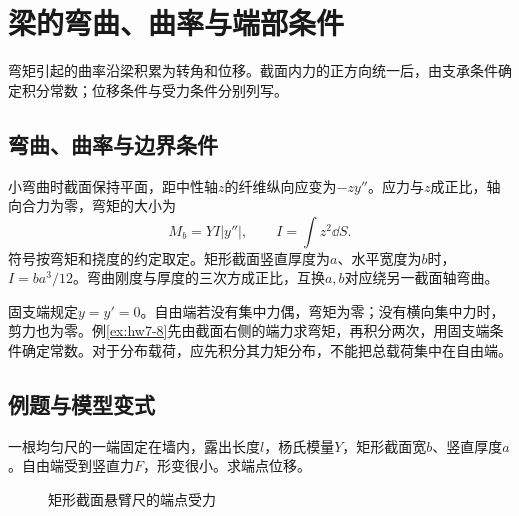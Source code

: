 \section{梁的弯曲、曲率与端部条件}

弯矩引起的曲率沿梁积累为转角和位移。截面内力的正方向统一后，由支承条件确定积分常数；位移条件与受力条件分别列写。



\subsection{弯曲、曲率与边界条件}
\label{sec:complete7-bending}
小弯曲时截面保持平面，距中性轴$z$的纤维纵向应变为$-zy''$。应力与$z$成正比，轴向合力为零，弯矩的大小为
\[
 M_b=YI|y''|,\qquad I=\int z^2\dd S.
\]
符号按弯矩和挠度的约定取定。矩形截面竖直厚度为$a$、水平宽度为$b$时，$I=ba^3/12$。弯曲刚度与厚度的三次方成正比，互换$a,b$对应绕另一截面轴弯曲。

固支端规定$y=y'=0$。自由端若没有集中力偶，弯矩为零；没有横向集中力时，剪力也为零。例\ref{ex:hw7-8}先由截面右侧的端力求弯矩，再积分两次，用固支端条件确定常数。对于分布载荷，应先积分其力矩分布，不能把总载荷集中在自由端。





\subsection{例题与模型变式}

\begin{example}[悬臂尺的端点位移]\label{ex:hw7-8}

一根均匀尺的一端固定在墙内，露出长度$l$，杨氏模量$Y$，矩形截面宽$b$、竖直厚度$a$。自由端受到竖直力$F$，形变很小。求端点位移。

\end{example}


\begin{figure}[H]\centering
{}
\caption{矩形截面悬臂尺的端点受力}\label{fig:hw7-8-q}
\end{figure}

